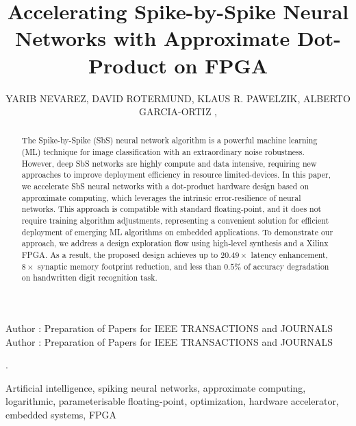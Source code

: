 \title {Accelerating Spike-by-Spike Neural Networks with Approximate Dot-Product on FPGA}

\author{
	\uppercase{Yarib Nevarez},	
	\uppercase{David Rotermund},
	\uppercase{Klaus R. Pawelzik},
	\uppercase{Alberto Garcia-Ortiz} ,
}

\address[1]{Institute of Electrodynamics and Microelectronics, University of Bremen, Bremen 28359, Germany (e-mail: nevarez@item.uni-bremen.de)}

\address[2]{Institute for Theoretical Physics, University of Bremen, Bremen 28359, Germany (e-mail: davrot@@neuro.uni-bremen.de)}

\address[3]{Institute for Theoretical Physics, University of Bremen, Bremen 28359, Germany (e-mail: pawelzik@@neuro.uni-bremen.de)}

\address[4]{Institute of Electrodynamics and Microelectronics, University of Bremen, Bremen 28359, Germany (e-mail: agaracia@item.uni-bremen.de)}


\markboth
{Author \headeretal: Preparation of Papers for IEEE TRANSACTIONS and JOURNALS}
{Author \headeretal: Preparation of Papers for IEEE TRANSACTIONS and JOURNALS}

.

\begin{abstract}
The Spike-by-Spike (SbS) neural network algorithm is a powerful machine learning (ML) technique for image classification with an extraordinary noise robustness. However, deep SbS networks are highly compute and data intensive, requiring new approaches to improve deployment efficiency in resource limited-devices. In this paper, we accelerate SbS neural networks with a dot-product hardware design based on approximate computing, which leverages the intrinsic error-resilience of neural networks. This approach is compatible with standard floating-point, and it does not require training algorithm adjustments, representing a convenient solution for efficient deployment of emerging ML algorithms on embedded applications. To demonstrate our approach, we address a design exploration flow using high-level synthesis and a Xilinx FPGA. As a result, the proposed design achieves up to $20.49\times$ latency enhancement, $8\times$ synaptic memory footprint reduction, and less than $0.5\%$ of accuracy degradation on handwritten digit recognition task.
	
\end{abstract}

\begin{keywords}
Artificial intelligence, spiking neural networks, approximate computing, logarithmic, parameterisable floating-point, optimization, hardware accelerator, embedded systems, FPGA
\end{keywords}

\titlepgskip=-15pt

\maketitle
